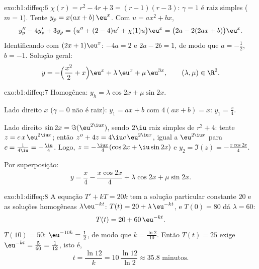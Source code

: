 \begin{solution}{exo:b1:diffeq:6}
$\chi(r) = r^2 - 4r + 3 = (r-1)(r-3)$: $\gamma = 1$ é raiz simples
($m = 1$). Tente $y_p = x(ax + b)\,\eu^x$. Com $u = ax^2 + bx$,
\[
y_p'' - 4y_p' + 3y_p = \bigl(u'' + (2 - 4)u' + \chi(1) u\bigr)\eu^x
= \bigl(2a - 2(2ax + b)\bigr)\eu^x .
\]
Identificando com $(2x + 1)\eu^x$: $-4a = 2$ e $2a - 2b = 1$, de modo que $a =
-\frac12$, $b = -1$. Solução geral:
\[
y = -\Bigl(\frac{x^2}{2} + x\Bigr)\eu^{x} + \lambda\,\eu^{x} +
\mu\,\eu^{3x}, \qquad (\lambda, \mu) \in \R^2 .
\]
\end{solution}

\begin{solution}{exo:b1:diffeq:7}
Homogênea: $y_h = \lambda\cos 2x + \mu\sin 2x$.

Lado direito $x$ ($\gamma = 0$ não é raiz): $y_1 = ax + b$ com
$4(ax + b) = x$: $y_1 = \frac x4$.

Lado direito $\sin 2x = \Im(\eu^{2\iu x})$, sendo $2\iu$ raiz simples de
$r^2 + 4$: tente $z = c\,x\,\eu^{2\iu x}$; então $z'' + 4z =
4\iu c\,\eu^{2\iu x}$, igual a $\eu^{2\iu x}$ para $c =
\frac{1}{4\iu} = -\frac{\iu}{4}$. Logo, $z = -\frac{\iu x}{4}(\cos 2x +
\iu \sin 2x)$ e $y_2 = \Im(z) = -\frac{x\cos 2x}{4}$.

Por superposição:
\[
y = \frac{x}{4} - \frac{x\cos 2x}{4} + \lambda\cos 2x + \mu\sin 2x .
\]
\end{solution}

\begin{solution}{exo:b1:diffeq:8}
A equação $T' + kT = 20k$ tem a solução particular constante $20$ e
as soluções homogêneas $\lambda\eu^{-kt}$: $T(t) = 20 +
\lambda\,\eu^{-kt}$, e $T(0) = 80$ dá $\lambda = 60$:
\[
T(t) = 20 + 60\,\eu^{-kt} .
\]
$T(10) = 50$: $\eu^{-10k} = \frac12$, de modo que $k = \frac{\ln 2}{10}$. Então
$T(t) = 25$ exige $\eu^{-kt} = \frac{5}{60} = \frac{1}{12}$, isto é,
\[
t = \frac{\ln 12}{k} = 10\,\frac{\ln 12}{\ln 2} \approx 35.8
\text{ minutos.}
\]
\end{solution}

